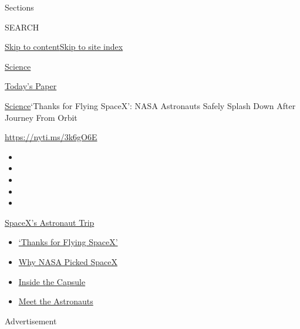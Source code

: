 Sections

SEARCH

\protect\hyperlink{site-content}{Skip to
content}\protect\hyperlink{site-index}{Skip to site index}

\href{https://www.nytimes.com/section/science}{Science}

\href{https://myaccount.nytimes.com/auth/login?response_type=cookie\&client_id=vi}{}

\href{https://www.nytimes.com/section/todayspaper}{Today's Paper}

\href{/section/science}{Science}\textbar{}`Thanks for Flying SpaceX':
NASA Astronauts Safely Splash Down After Journey From Orbit

\url{https://nyti.ms/3k6gO6E}

\begin{itemize}
\item
\item
\item
\item
\item
\end{itemize}

\href{https://www.nytimes.com/2020/08/02/science/spacex-astronauts-splashdown.html?action=click\&pgtype=Article\&state=default\&region=TOP_BANNER\&context=storylines_menu}{SpaceX's
Astronaut Trip}

\begin{itemize}
\tightlist
\item
  \href{https://www.nytimes.com/2020/08/02/science/spacex-astronauts-splashdown.html?action=click\&pgtype=Article\&state=default\&region=TOP_BANNER\&context=storylines_menu}{`Thanks
  for Flying SpaceX'}
\item
  \href{https://www.nytimes.com/2020/05/26/science/spacex-launch-nasa.html?action=click\&pgtype=Article\&state=default\&region=TOP_BANNER\&context=storylines_menu}{Why
  NASA Picked SpaceX}
\item
  \href{https://www.nytimes.com/interactive/2020/05/26/science/spacex-nasa.html?action=click\&pgtype=Article\&state=default\&region=TOP_BANNER\&context=storylines_menu}{Inside
  the Capsule}
\item
  \href{https://www.nytimes.com/2020/05/27/science/bob-behnken-doug-hurley.html?action=click\&pgtype=Article\&state=default\&region=TOP_BANNER\&context=storylines_menu}{Meet
  the Astronauts}
\end{itemize}

Advertisement

